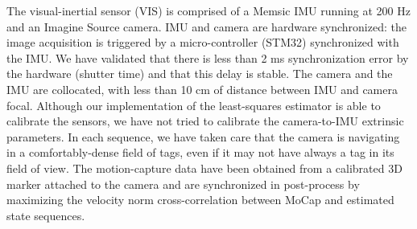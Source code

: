 The visual-inertial sensor (VIS) is comprised of a Memsic IMU running at 200 Hz and an Imagine Source camera.
IMU and camera are hardware synchronized: the image acquisition is triggered by a micro-controller (STM32) synchronized with the IMU.
We have validated that there is less than 2 ms synchronization error by the hardware (shutter time) and that this delay is stable.
The camera and the IMU are collocated, with less than 10 cm of distance between IMU and camera focal. 
Although our implementation of the least-squares estimator is able to calibrate the sensors, we have not tried to calibrate the camera-to-IMU extrinsic parameters.
In each sequence, we have taken care that the camera is navigating in a comfortably-dense field of tags, even if it may not have always a tag in its field of view.
The motion-capture data have been obtained from a calibrated 3D marker attached to the camera and are synchronized in post-process by maximizing the velocity norm 
cross-correlation between MoCap and estimated state sequences.
%
